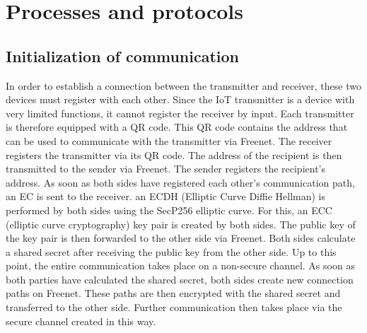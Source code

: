 \chapter{Processes and protocols}
\section{Initialization of communication}
In order to establish a connection between the transmitter and receiver, these two devices must register with each other. Since the IoT transmitter is a device with very limited functions, it cannot register the receiver by input. Each transmitter is therefore equipped with a QR code. This QR code contains the address that can be used to communicate with the transmitter via Freenet.
The receiver registers the transmitter via its QR code. The address of the recipient is then transmitted to the sender via Freenet. The sender registers the recipient's address.
As soon as both sides have registered each other's communication path, an EC is sent to the receiver.
an ECDH (Elliptic Curve Diffie Hellman) is performed by both sides using the SecP256 elliptic curve. 
For this, an ECC (elliptic curve cryptography) key pair is created by both sides. 
The public key of the key pair is then forwarded to the other side via Freenet. Both sides calculate a shared secret after receiving the public key from the other side. Up to this point, the entire communication takes place on a non-secure channel. 
As soon as both parties have calculated the shared secret, both sides create new connection paths on Freenet. These paths are then encrypted with the shared secret and transferred to the other side.
Further communication then takes place via the secure channel created in this way.
\newpage
